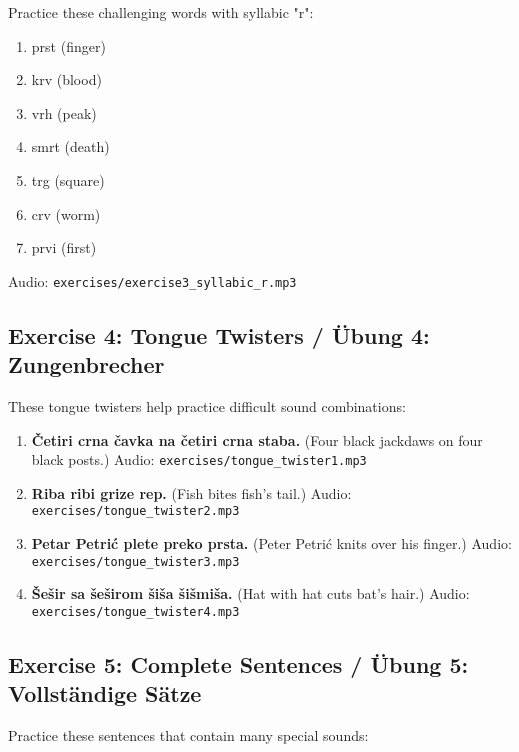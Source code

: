 Practice these challenging words with syllabic "r":

\begin{enumerate}
    \item prst (finger)
    \item krv (blood)
    \item vrh (peak)
    \item smrt (death)
    \item trg (square)
    \item crv (worm)
    \item prvi (first)
\end{enumerate}

Audio: \texttt{exercises/exercise3\_syllabic\_r.mp3}

\subsection{Exercise 4: Tongue Twisters / Übung 4: Zungenbrecher}

These tongue twisters help practice difficult sound combinations:

\begin{enumerate}
    \item \textbf{Četiri crna čavka na četiri crna staba.}
    (Four black jackdaws on four black posts.)
    Audio: \texttt{exercises/tongue\_twister1.mp3}
    
    \item \textbf{Riba ribi grize rep.}
    (Fish bites fish's tail.)
    Audio: \texttt{exercises/tongue\_twister2.mp3}
    
    \item \textbf{Petar Petrić plete preko prsta.}
    (Peter Petrić knits over his finger.)
    Audio: \texttt{exercises/tongue\_twister3.mp3}
    
    \item \textbf{Šešir sa šeširom šiša šišmiša.}
    (Hat with hat cuts bat's hair.)
    Audio: \texttt{exercises/tongue\_twister4.mp3}
\end{enumerate}

\subsection{Exercise 5: Complete Sentences / Übung 5: Vollständige Sätze}

Practice these sentences that contain many special sounds:

